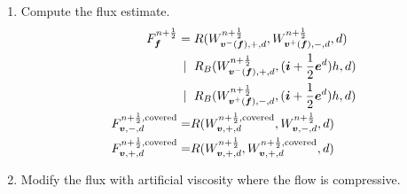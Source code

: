 \begin{enumerate}
\item Compute the flux estimate.
\begin{align}
\begin{split}
F^{n+\frac{1}{2}}_{{\boldsymbol{f}}} = & \;
R(W^{n+\frac{1}{2}}_{{\boldsymbol{v}}^-({\boldsymbol{f}}), +, d}, W^{n+\frac{1}{2}}_{{\boldsymbol{v}}^+({\boldsymbol{f}}), - ,d},  d) \\ 
| ~ & \; R_B(W^{n+\frac{1}{2}}_{{\boldsymbol{v}}^-({\boldsymbol{f}}), +, d}, ({\boldsymbol{i}} + \frac{1}{2} {\boldsymbol{e}}^d)h, d) \\ 
| ~ & \; R_B(W^{n+\frac{1}{2}}_{{\boldsymbol{v}}^+({\boldsymbol{f}}), -, d}, ({\boldsymbol{i}} + \frac{1}{2} {\boldsymbol{e}}^d)h, d) \\
F^{n+\frac{1}{2},\text{covered}}_{{\boldsymbol{v}}, -, d} = &
 R(W^{n+\frac{1}{2},\text{covered}}_{{\boldsymbol{v}},+,d},W^{{n + \frac{1}{2}}}_{{\boldsymbol{v}},-,d},d) \\
F^{n+\frac{1}{2},\text{covered}}_{{\boldsymbol{v}}, +, d} = &
 R(W^{n+\frac{1}{2}}_{{\boldsymbol{v}},+,d},W^{{n + \frac{1}{2}},\text{covered}}_{{\boldsymbol{v}},+,d},d)
\end{split}
\label{eqn::riemann3}
\end{align}

\item Modify the flux with artificial viscosity where the
flow is compressive. 

\end{enumerate}

